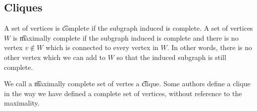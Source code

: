 \subsection*{Cliques}

A set of vertices is \t{complete} if the subgraph induced is complete.
A set of vertices $W$ is \t{maximally complete} if the subgraph induced is complete and there is no vertex $v \not\in W$ which is connected to every vertex in $W$.
In other words, there is no other vertex which we can add to $W$ so that the induced subgraph is still complete.

We call a \t{maximally complete} set of vertes a \t{clique}.
Some authors define a clique in the way we have defined a complete set of vertices, without reference to the maximality.


